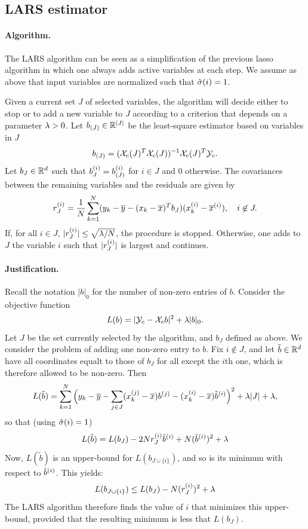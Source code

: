 \subsection{LARS estimator}
\paragraph{Algorithm.}
The LARS algorithm can be seen as a simplification of the previous lasso algorithm in which one always adds active variables at each step.
We assume as above that input variables are normalized such that $\hat{\sigma}(i) = 1$.

Given a current set $J$ of selected variables, the algorithm will decide either to stop  or to add a new variable to $J$ according to a criterion that depends on a parameter $\lambda>0$. 
Let $b_{(J)}\in {\mathbb{R}}^{|J|}$ be the least-square estimator based on variables in $J$
\[
b_{(J)} = ({\mathcal X}_c(J)^T{\mathcal X}_c(J))^{-1} {\mathcal X}_c(J)^T{\mathcal Y}_c.
\]
Let $b_J\in {\mathbb{R}}^d$ such that $b_J^{(i)} = b_{(J)}^{(i)} $ for $i\in J$ and 0 otherwise. The covariances between the remaining variables and the residuals are given by
\[
r_J^{(i)} = \frac1N \sum_{k=1}^N (y_k -\overline{y} -  (x_k-\overline{x})^Tb_J) 
(x_k^{(i)} -\overline{x}^{(i)}), \quad i\not\in J.
\]
If, for all $i\in J$, $|r_J^{(i)}| \leq \sqrt{\lambda/N}$, the procedure is stopped.
Otherwise, one adds to $J$ the variable $i$ such that  $|r_J^{(i)}|$ is largest and continues.
\bigskip

\paragraph{Justification.}
Recall the notation $|b|_0$ for the number of non-zero entries of $b$.
Consider the objective function
\[
L(b) = |{\mathcal Y}_c - {\mathcal X}_cb|^2 + \lambda |b|_0.
\]
 Let $J$ be the set currently selected by the algorithm, and $b_J$ defined as above. We consider the problem of adding one non-zero entry to $b$. Fix $i\not\in J$, and let $\tilde b\in {\mathbb{R}}^d$ have all coordinates equalt to those of  $b_J$ for all except the $i$th one, which is therefore allowed to be non-zero. 
Then
\[
L(\tilde b) = \sum_{k=1}^N \Big(y_k - \overline{y} - \sum_{j\in J} (x_k^{(j)} - \overline{x}) b^{(j)} - (x_k^{(i)}  - \overline{x})\tilde b^{(i)}\Big)^2 + \lambda |J| + \lambda,
\]
so that (using $\hat{\sigma}(i) = 1$)
\[
L(\tilde b) = L(b_J) - 2 N r_J^{(i)} \tilde b^{(i)} + N(\tilde b^{(i)})^2 + \lambda
\]
 Now, $L(\tilde b)$ is an upper-bound for $L(b_{J\cup\{i\}})$, and so is its minimum with respect to $\tilde b^{(i)}$. This yields:
\[
L(b_{J\cup\{i\}}) \leq L(b_J) - N (r_J^{(i)})^2 + \lambda
\]
 The LARS algorithm therefore finds the value of $i$ that minimizes this upper-bound, provided that the resulting minimum is less that $L(b_J)$.
\bigskip

